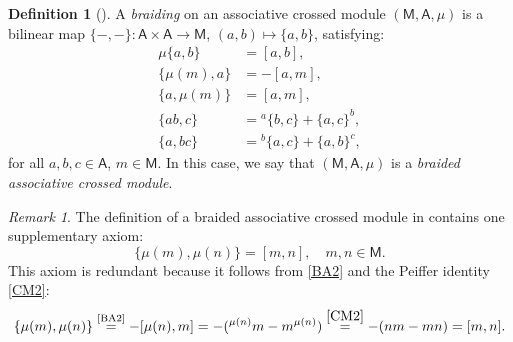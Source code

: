 \documentclass[12pt,reqno]{amsart}
\theoremstyle{plain}
\theoremstyle{definition}
\newtheorem{definition}[theorem]{Definition}
\theoremstyle{remark}
\newtheorem{remark}[theorem]{Remark}
\newcommand{\A}{\ensuremath{\mathsf{A}}}
\newcommand{\MM}{\ensuremath{\mathsf{M}}}
\numberwithin{equation}{section}
\begin{document}
\begin{definition}[{\cite[Definition~3.3]{FFL1}}]
A \emph{braiding} on an associative crossed module  $(\MM,\A,\mu)$ is a  
	bilinear map $\{-,-\} \colon \A \times \A\xrightarrow{}\MM$, $(a,b)\mapsto \{a,b\}$, satisfying:
	\begin{align}
		\mu\{a,b\} & =[a ,b],\tag{BA1}\label{BA1}\\
		\{\mu(m),a \} & =-[a,m],\tag{BA2}\label{BA2}\\
		\{a,\mu (m)\} & = [a,m],\tag{BA3}\label{BA3}\\
		\lbrace a b ,c \rbrace  & =  {}^a \lbrace b,c\rbrace + \lbrace a,c\rbrace ^b ,\tag{BA4}\label{BA4} \\
		\lbrace a  , bc \rbrace  & =  {}^b \lbrace a,c\rbrace + \lbrace a,b\rbrace ^c ,\tag{BA5}\label{BA5} 
	\end{align}
	for all $a,b,c\in \A$, $m\in \MM$.
	In this case, we say that $(\MM,\A,\mu)$ is a \emph{braided associative crossed module}.
\end{definition}

\begin{remark}
	The definition of a braided associative crossed module in \cite[Definition~3.3]{FFL1}  contains one supplementary axiom:
	\[ \{\mu (m),\mu (n) \}=[m,n],\quad m,n\in \MM.\]
	This axiom is redundant because
it follows from \eqref{BA2} and the Peiffer identity  \eqref{CM2}:
	\[\{\mu(m), \mu (n)  \} \stackrel{\text{\eqref{BA2}}}{=} - [\mu (n),m]= -({}^{\mu (n)} m - m^{\mu (n)}) \stackrel{\eqref{CM2}}{=} -(nm -mn) =[ m,n] .\]
\end{remark}
\end{document}
